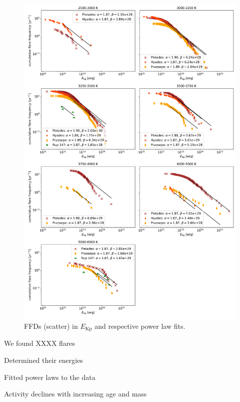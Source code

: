 \documentclass{aa}
\begin{document}
\begin{figure}
    \centering
    \includegraphics[width=16cm]{pics/FFDs/SpT_wise_sample_ffd_energy_wheatland.png}
    \caption{FFDs (scatter) in $E_\mathrm{Kp}$ and respective power law fits.}          	\label{powerlawfits_s}
\end{figure}

 We found XXXX flares

 Determined their energies

 Fitted power laws to the data

Activity declines with increasing age and mass
 
\end{document}

